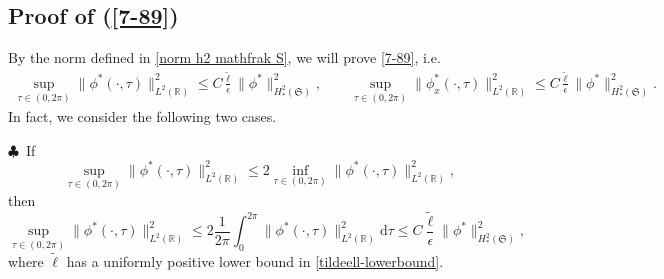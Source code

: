 \documentclass[10pt, reqno]{amsart}
\numberwithin{equation}{section}
\theoremstyle{definition}
\newcommand{\e}{\epsilon}
\def\p{\partial}
\begin{document}
{\begin{appendix}



\medskip
\section{Proof of (\ref{7-89}) } \label{appendixa1}

By the norm defined in \eqref{norm h2 mathfrak S}, we will prove \eqref{7-89}, i.e.
\begin{align}
\sup_{\tau \in (0, 2\pi)} \|\phi^*(\cdot, \tau)\|^2_{L^2({\mathbb R})} \le C\frac{\tilde \ell} {\epsilon} \|\phi^*\|_{H^2_*(\mathfrak S)}^2,
\qquad
\sup_{\tau \in (0, 2\pi)} \|\phi_x^*(\cdot, \tau)\|^2_{L^2({\mathbb R})} \le C \frac{\tilde \ell} {\epsilon} \|\phi^*\|_{H^2_*(\mathfrak S)}^2.
\label{7-89-1}
\end{align}
In fact, we consider the following two cases.

\smallskip
\noindent $\clubsuit$\
If
$$
\sup_{\tau \in (0, 2\pi)} \|\phi^*(\cdot, \tau)\|^2_{L^2({\mathbb R})}
\leq 2\inf_{\tau \in (0, 2\pi)} \|\phi^*(\cdot, \tau)\|^2_{L^2({\mathbb R})} ,
$$
then
$$
\sup_{\tau \in (0, 2\pi)} \|\phi^*(\cdot, \tau)\|^2_{L^2({\mathbb R})}
\leq
2\frac{1}{2\pi}\int_0^{2\pi}\|\phi^*(\cdot, \tau)\|^2_{L^2({\mathbb R})} {\mathrm d}\tau
\leq C\frac{\tilde \ell} {\epsilon} \|\phi^*\|_{H^2_*(\mathfrak S)}^2,
$$
where ${\tilde\ell}$ has a uniformly positive lower bound in \eqref{tildeell-lowerbound}.


\end{appendix}}
\end{document}
